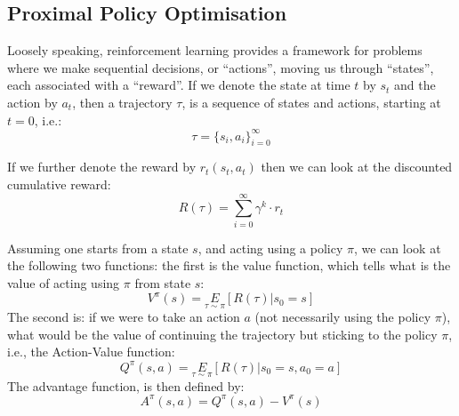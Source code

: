 \subsection{Proximal Policy Optimisation}
\label{sec:ppo}
Loosely speaking, reinforcement learning provides a framework for problems where we make sequential decisions, or ``actions'', 
moving us through ``states'', each associated with a ``reward''.
If we denote the state at time \(t\) by \(s_{t}\) and the action by \(a_{t}\), then a trajectory \(\tau\), 
is a sequence of states and actions, starting at \(t=0\), i.e.:
\begin{equation}
\tau = \{s_i, a_i\}_{i=0}^{\infty}
\end{equation}

\noindent If we further denote the reward by \(r_t(s_{t}, a_{t})\)
then we can look at the discounted cumulative reward:
\begin{equation}
\label{eq:return}
 R(\tau) = \sum_{i=0}^{\infty} \gamma^{k}\cdot r_t 
\end{equation}

\noindent Assuming one starts from a state \(s\), and acting using a policy \(\pi\), we can look at the following two functions: the first is the value function, which tells what is the value of acting using \(\pi\) from state \(s\):
\begin{equation}
    V^{\pi}(s) = \underset{\tau \sim \pi}{E}\left[R(\tau)| s_0 = s\right]
\end{equation}
The second is: if we were to take an action \(a\) (not necessarily using the policy \(\pi\)), what would be the value of continuing the trajectory but sticking to the policy \(\pi\), i.e., the Action-Value function:
\begin{equation}
    Q^{\pi}(s,a) = \underset{\tau \sim \pi}{E} \left[R(\tau)| s_0 = s, a_0 = a\right]
\end{equation}
\noindent The advantage function, is then defined by:
\begin{equation}
A^{\pi}(s,a) = Q^{\pi}(s,a) - V^{\pi}(s)
\end{equation}

